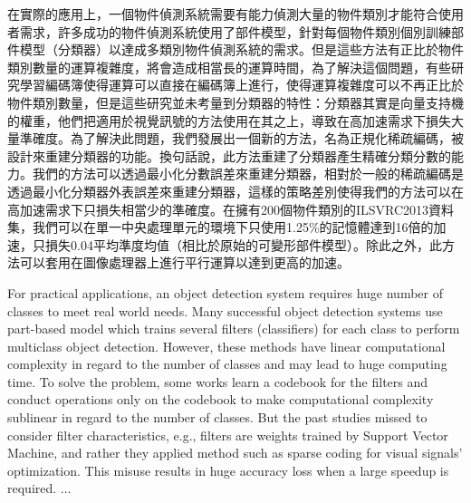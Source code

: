 \begin{abstractzh}

在實際的應用上，一個物件偵測系統需要有能力偵測大量的物件類別才能符合使用者需求，許多成功的物件偵測系統使用了部件模型，針對每個物件類別個別訓練部件模型（分類器）以達成多類別物件偵測系統的需求。但是這些方法有正比於物件類別數量的運算複雜度，將會造成相當長的運算時間，為了解決這個問題，有些研究學習編碼簿使得運算可以直接在編碼簿上進行，使得運算複雜度可以不再正比於物件類別數量，但是這些研究並未考量到分類器的特性：分類器其實是向量支持機的權重，他們把適用於視覺訊號的方法使用在其之上，導致在高加速需求下損失大量準確度。為了解決此問題，我們發展出一個新的方法，名為正規化稀疏編碼，被設計來重建分類器的功能。換句話說，此方法重建了分類器產生精確分類分數的能力。我們的方法可以透過最小化分數誤差來重建分類器，相對於一般的稀疏編碼是透過最小化分類器外表誤差來重建分類器，這樣的策略差別使得我們的方法可以在高加速需求下只損失相當少的準確度。在擁有200個物件類別的ILSVRC2013資料集，我們可以在單一中央處理單元的環境下只使用1.25\%的記憶體達到16倍的加速，只損失0.04平均準度均值（相比於原始的可變形部件模型）。除此之外，此方法可以套用在圖像處理器上進行平行運算以達到更高的加速。

\end{abstractzh}

\begin{abstracten}
	
For practical applications, an object detection system requires huge number of classes to meet real world needs. Many successful object detection systems use part-based model which trains several filters (classifiers) for each class to perform multiclass object detection. However, these methods have linear computational complexity in regard to the number of classes and may lead to huge computing time. To solve the problem, some works learn a codebook for the filters and conduct operations only on the codebook to make computational complexity sublinear in regard to the number of classes. But the past studies missed to consider filter characteristics, e.g., filters are weights trained by Support Vector Machine, and rather they applied method such as sparse coding for visual signals' optimization. This misuse results in huge accuracy loss when a large speedup is required. ...

\end{abstracten}

